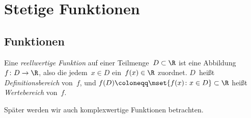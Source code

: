 \documentclass[a4paper]{article}
\begin{document}

\section{Stetige Funktionen}

\subsection{Funktionen}

\begin{definition}[Funktion in~$\R$]
    Eine \emph{reellwertige Funktion} auf einer Teilmenge~$D \subset \R$ ist eine Abbildung $f\colon D \to \R$, also die jedem~$x \in D$ ein~$f(x) \in \R$ zuordnet. $D$~heißt \emph{Definitionsbereich} von~$f$, und $f(D) \coloneqq \mset{f(x) \colon x \in D} \subset \R$ heißt \emph{Wertebereich} von~$f$.
\end{definition}

Später werden wir auch komplexwertige Funktionen betrachten.
\end{document}

